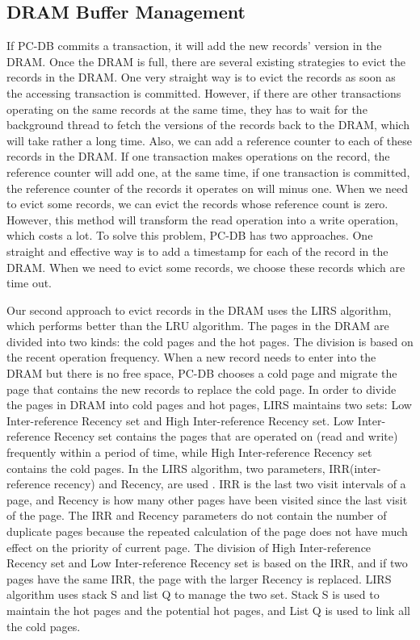 
    
\subsection{DRAM Buffer Management}
If PC-DB commits a transaction, it will add the new records' version in the DRAM. Once the DRAM is full, there are several existing strategies to evict the records in the DRAM. One very straight way is to evict the records as soon as the accessing transaction is committed. 
However, if there are other transactions operating on the same records at the same time, they has to wait for the background thread to fetch the versions of the records back to the DRAM, which will take rather a long time. Also, we can  add a reference counter to each of these records in the DRAM. 
If one transaction makes operations on the record, the reference counter will add one, at the same time, if one transaction is committed, 
the reference counter of the records it operates on will minus one. 
When we need to evict some records, we can evict the records whose reference count is zero. 
However, this method will transform the read operation into a write operation, which costs a lot. 
To solve this problem, PC-DB has two approaches. One straight and effective way is to add a timestamp for each of the record in the DRAM. 
When we need to evict some records, we choose these records which are time out. 

Our second approach to evict records in the DRAM uses the LIRS algorithm, 
which performs better than the LRU algorithm. 
The pages in the DRAM are divided into two kinds: the cold pages and the hot pages. 
The division is based on the recent operation frequency. 
When a new record needs to enter into the DRAM but there is no free space, 
PC-DB chooses a cold page and migrate the page that contains the new records to replace the cold page. 
In order to divide the pages in DRAM into cold pages and hot pages, LIRS maintains two sets: Low Inter-reference Recency set and High Inter-reference Recency set. 
Low Inter-reference Recency set contains the pages that are operated on (read and write) frequently within a period of time, while High Inter-reference Recency set contains the cold pages. 
In the LIRS algorithm, two parameters, IRR(inter-reference recency) and Recency, are used . 
IRR is the last two visit intervals of a page, and Recency is how many other pages have been visited since the last visit of the page. 
The IRR and Recency parameters do not contain the number of duplicate pages because the repeated calculation of the page does not have much effect on the priority of current page. 
The division of High Inter-reference Recency set and Low Inter-reference Recency set is based on the IRR, and if two pages have the same IRR, the page with the larger Recency is replaced. 
LIRS algorithm uses stack S and list Q to manage the two set. 
Stack S is used to maintain the hot pages and the potential hot pages, 
and List Q is used to link all the cold pages. 

